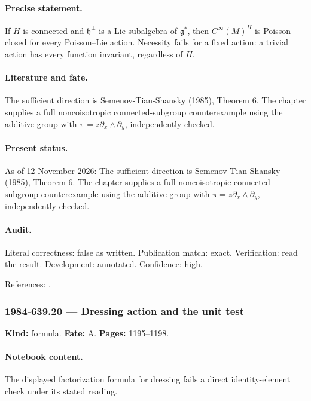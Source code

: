 \paragraph{Precise statement.} If \(H\) is connected and \(\mathfrak h^\perp\) is a Lie subalgebra of \(\mathfrak g^*\), then \(C^\infty(M)^H\) is Poisson-closed for every Poisson--Lie action. Necessity fails for a fixed action: a trivial action has every function invariant, regardless of \(H\).

\paragraph{Literature and fate.} The sufficient direction is Semenov-Tian-Shansky (1985), Theorem 6. The chapter supplies a full noncoisotropic connected-subgroup counterexample using the additive group with \(\pi=z\partial_x\wedge\partial_y\), independently checked.

\paragraph{Present status.} As of 12 November 2026: The sufficient direction is Semenov-Tian-Shansky (1985), Theorem 6. The chapter supplies a full noncoisotropic connected-subgroup counterexample using the additive group with \(\pi=z\partial_x\wedge\partial_y\), independently checked.

\paragraph{Audit.} Literal correctness: false as written. Publication match: exact. Verification: read the result. Development: annotated. Confidence: high.

\noindent References: \citep{semenov1985dressing}.\par

\subsubsection{1984-639.20 --- Dressing action and the unit test}

\label{item:1984-639.20}

\noindent\textbf{Kind:} formula. \textbf{Fate:} A. \textbf{Pages:} 1195--1198.\par

\paragraph{Notebook content.} The displayed factorization formula for dressing fails a direct identity-element check under its stated reading.


